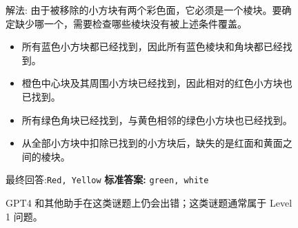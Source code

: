 \documentclass{fairmeta}
\begin{document}
\begin{figure}[h!]
\begin{tcolorbox}[colframe=RoyalBlue, colback=white]
解法:
由于被移除的小方块有两个彩色面，它必须是一个棱块。要确定缺少哪一个，需要检查哪些棱块没有被上述条件覆盖。
\begin{itemize}
 \item 所有蓝色小方块都已经找到，因此所有蓝色棱块和角块都已经找到。
 \item 橙色中心块及其周围小方块已经找到，因此相对的红色小方块也已找到。
 \item 所有绿色角块已经找到，与黄色相邻的绿色小方块也已经找到。
 \item 从全部小方块中扣除已找到的小方块后，缺失的是红面和黄面之间的棱块。
\end{itemize}

最终回答:\texttt{Red, Yellow} \hspace{.5cm}\textbf{标准答案:} \texttt{green, white} \textcolor{red}{\Large {}}


 \end{tcolorbox}
 \caption{GPT4 和其他助手在这类谜题上仍会出错；这类谜题通常属于 Level 1 问题。}
 \label{fig:demo_gpt4_rubikscube}
\end{figure}
\end{document}
